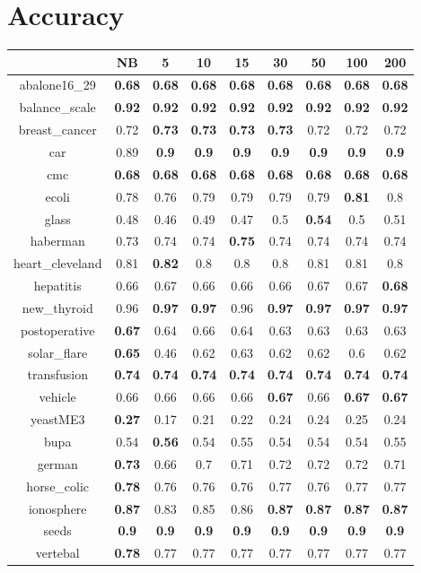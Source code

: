 \documentclass{article}%
\begin{document}
%
\normalsize%
\section*{Accuracy}%
\begin{tabular}{c|cccccccc}%
\hline%
&NB&5&10&15&30&50&100&200\\%
\hline%
abalone16\_29&\textbf{0.68}&\textbf{0.68}&\textbf{0.68}&\textbf{0.68}&\textbf{0.68}&\textbf{0.68}&\textbf{0.68}&\textbf{0.68}\\%
\hline%
balance\_scale&\textbf{0.92}&\textbf{0.92}&\textbf{0.92}&\textbf{0.92}&\textbf{0.92}&\textbf{0.92}&\textbf{0.92}&\textbf{0.92}\\%
\hline%
breast\_cancer&0.72&\textbf{0.73}&\textbf{0.73}&\textbf{0.73}&\textbf{0.73}&0.72&0.72&0.72\\%
\hline%
car&0.89&\textbf{0.9}&\textbf{0.9}&\textbf{0.9}&\textbf{0.9}&\textbf{0.9}&\textbf{0.9}&\textbf{0.9}\\%
\hline%
cmc&\textbf{0.68}&\textbf{0.68}&\textbf{0.68}&\textbf{0.68}&\textbf{0.68}&\textbf{0.68}&\textbf{0.68}&\textbf{0.68}\\%
\hline%
ecoli&0.78&0.76&0.79&0.79&0.79&0.79&\textbf{0.81}&0.8\\%
\hline%
glass&0.48&0.46&0.49&0.47&0.5&\textbf{0.54}&0.5&0.51\\%
\hline%
haberman&0.73&0.74&0.74&\textbf{0.75}&0.74&0.74&0.74&0.74\\%
\hline%
heart\_cleveland&0.81&\textbf{0.82}&0.8&0.8&0.8&0.81&0.81&0.8\\%
\hline%
hepatitis&0.66&0.67&0.66&0.66&0.66&0.67&0.67&\textbf{0.68}\\%
\hline%
new\_thyroid&0.96&\textbf{0.97}&\textbf{0.97}&0.96&\textbf{0.97}&\textbf{0.97}&\textbf{0.97}&\textbf{0.97}\\%
\hline%
postoperative&\textbf{0.67}&0.64&0.66&0.64&0.63&0.63&0.63&0.63\\%
\hline%
solar\_flare&\textbf{0.65}&0.46&0.62&0.63&0.62&0.62&0.6&0.62\\%
\hline%
transfusion&\textbf{0.74}&\textbf{0.74}&\textbf{0.74}&\textbf{0.74}&\textbf{0.74}&\textbf{0.74}&\textbf{0.74}&\textbf{0.74}\\%
\hline%
vehicle&0.66&0.66&0.66&0.66&\textbf{0.67}&0.66&\textbf{0.67}&\textbf{0.67}\\%
\hline%
yeastME3&\textbf{0.27}&0.17&0.21&0.22&0.24&0.24&0.25&0.24\\%
\hline%
bupa&0.54&\textbf{0.56}&0.54&0.55&0.54&0.54&0.54&0.55\\%
\hline%
german&\textbf{0.73}&0.66&0.7&0.71&0.72&0.72&0.72&0.71\\%
\hline%
horse\_colic&\textbf{0.78}&0.76&0.76&0.76&0.77&0.76&0.77&0.77\\%
\hline%
ionosphere&\textbf{0.87}&0.83&0.85&0.86&\textbf{0.87}&\textbf{0.87}&\textbf{0.87}&\textbf{0.87}\\%
\hline%
seeds&\textbf{0.9}&\textbf{0.9}&\textbf{0.9}&\textbf{0.9}&\textbf{0.9}&\textbf{0.9}&\textbf{0.9}&\textbf{0.9}\\%
\hline%
vertebal&\textbf{0.78}&0.77&0.77&0.77&0.77&0.77&0.77&0.77\\%
\hline%
\end{tabular}
\end{document}
